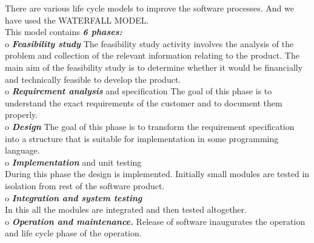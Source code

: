 \documentclass{scrartcl}
\begin{document}
There are various life cycle models to improve the software processes. And we have used the WATERFALL MODEL.\\
This model contains\textbf{\textit{  6 phases:}}\\
o \textbf{\textit{ Feasibility study}}
The feasibility study activity involves the analysis of the problem and
collection of the relevant information relating to the product. The main aim
of the feasibility study is to determine whether it would be financially and
technically feasible to develop the product.\\
o \textbf{\textit{Requirement analysis }} and specification
The goal of this phase is to understand the exact requirements of the
customer and to document them properly.\\
o\textbf{\textit{ Design }}
The goal of this phase is to transform the requirement specification into a
structure that is suitable for implementation in some programming language.\\
o \textbf{\textit{Implementation }} and unit testing\\
During this phase the design is implemented. Initially small modules are
tested in isolation from rest of the software product.\\
o \textbf{\textit{ Integration and system testing}}\\
In this all the modules are integrated and then tested altogether.\\
o \textbf{\textit{Operation and maintenance. }} 
Release of software inaugurates the operation and life cycle phase of the
operation.\\
\end{document}
